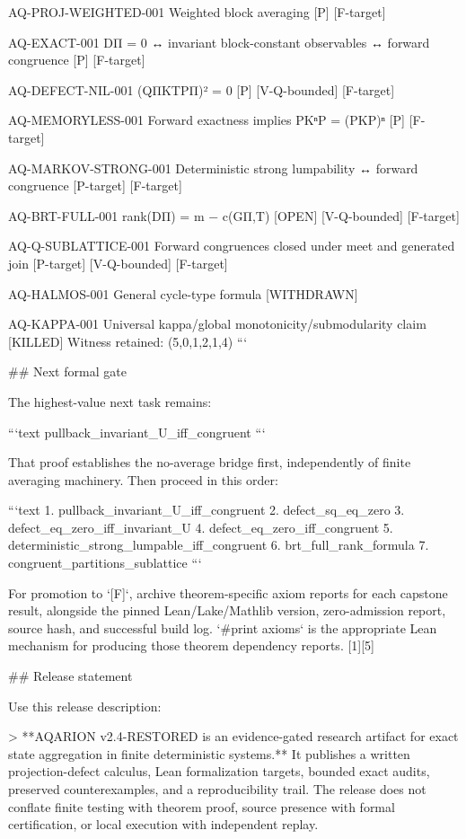 AQ-PROJ-WEIGHTED-001
Weighted block averaging
[P] [F-target]

AQ-EXACT-001
DΠ = 0 ↔ invariant block-constant observables ↔ forward congruence
[P] [F-target]

AQ-DEFECT-NIL-001
(QΠKTPΠ)² = 0
[P] [V-Q-bounded] [F-target]

AQ-MEMORYLESS-001
Forward exactness implies PKⁿP = (PKP)ⁿ
[P] [F-target]

AQ-MARKOV-STRONG-001
Deterministic strong lumpability ↔ forward congruence
[P-target] [F-target]

AQ-BRT-FULL-001
rank(DΠ) = m − c(GΠ,T)
[OPEN] [V-Q-bounded] [F-target]

AQ-Q-SUBLATTICE-001
Forward congruences closed under meet and generated join
[P-target] [V-Q-bounded] [F-target]

AQ-HALMOS-001
General cycle-type formula
[WITHDRAWN]

AQ-KAPPA-001
Universal kappa/global monotonicity/submodularity claim
[KILLED]
Witness retained: (5,0,1,2,1,4)
```

## Next formal gate

The highest-value next task remains:

```text
pullback_invariant_U_iff_congruent
```

That proof establishes the no-average bridge first, independently of finite averaging machinery. Then proceed in this order:

```text
1. pullback_invariant_U_iff_congruent
2. defect_sq_eq_zero
3. defect_eq_zero_iff_invariant_U
4. defect_eq_zero_iff_congruent
5. deterministic_strong_lumpable_iff_congruent
6. brt_full_rank_formula
7. congruent_partitions_sublattice
```

For promotion to `[F]`, archive theorem-specific axiom reports for each capstone result, alongside the pinned Lean/Lake/Mathlib version, zero-admission report, source hash, and successful build log. `#print axioms` is the appropriate Lean mechanism for producing those theorem dependency reports. [1][5]

## Release statement

Use this release description:

> **AQARION v2.4-RESTORED is an evidence-gated research artifact for exact state aggregation in finite deterministic systems.** It publishes a written projection-defect calculus, Lean formalization targets, bounded exact audits, preserved counterexamples, and a reproducibility trail. The release does not conflate finite testing with theorem proof, source presence with formal certification, or local execution with independent replay.

